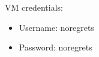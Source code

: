 \documentclass[a4paper,UKenglish]{darts-v2018}
\begin{document}
VM credentials:
\begin{itemize}
    \item Username: noregrets
    \item Password: noregrets
\end{itemize}



%

\end{document}
